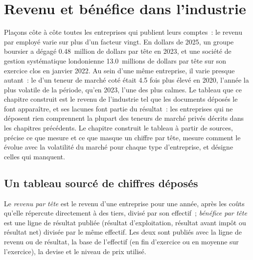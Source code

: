 \chapter{Revenu et bénéfice dans l'industrie}\label{ch:in:revenue-and-profit-across-the-industry}

Plaçons côte à côte toutes les entreprises qui publient leurs comptes~: le revenu par employé varie sur plus d'un facteur vingt. En
dollars de 2025, un groupe boursier a dégagé 0.48~million de dollars par tête en 2023, et une société de gestion systématique londonienne 13.0~millions de dollars par tête sur son exercice clos en janvier 2022.
Au sein d'une même entreprise, il varie presque autant~: le  d'un teneur de marché coté était 4.5 fois plus élevé en 2020, l'année la plus volatile de la période, qu'en 2023, l'une des plus calmes. Le tableau
que ce chapitre construit est le revenu de l'industrie tel que les documents déposés le font apparaître, et ses lacunes font partie du résultat~: les
entreprises qui ne déposent rien comprennent la plupart des teneurs de marché privés décrits dans les chapitres précédents. Le chapitre construit
le tableau à partir de sources, précise ce que mesure et ce que masque un chiffre par tête, mesure comment le  évolue avec la
volatilité du marché pour chaque type d'entreprise, et désigne celles qui manquent.

\section{Un tableau sourcé de chiffres déposés}

\begin{definition}\label{def:in:revenue-and-profit-across-the-industry:perhead}
Le \emph{revenu par tête} est le revenu d'une entreprise pour une année, après les coûts qu'elle répercute
directement à des tiers, divisé par son effectif~; \emph{bénéfice par tête} est une ligne de résultat publiée
(résultat d'exploitation, résultat avant impôt ou résultat net) divisée par le même effectif. Les deux sont publiés avec la ligne de revenu
ou de résultat, la base de l'effectif (en fin d'exercice ou en moyenne sur l'exercice), la devise et le niveau de prix
utilisé.
\end{definition}

